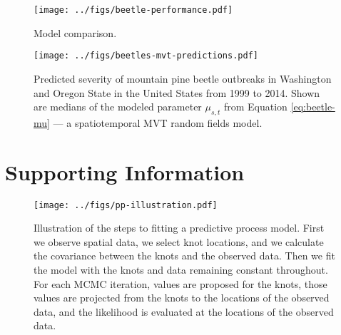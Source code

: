 \documentclass[12pt,english]{article}
\begin{document}
\begin{spacing}{1.3}
\begin{figure}[htb]
  \begin{center}
    \texttt{[image: ../figs/beetle-performance.pdf]}
    \caption{
      Model comparison.
    }
    \label{fig:map-etc}
  \end{center}
\end{figure}

\clearpage

\begin{figure}[htb]
  \begin{center}
    \texttt{[image: ../figs/beetles-mvt-predictions.pdf]}
    \caption{Predicted severity of mountain pine beetle outbreaks in Washington and
      Oregon State in the United States from 1999 to 2014.
      Shown are medians of the modeled parameter $\mu_{s,t}$ from Equation \ref{eq:beetle-mu}
      --- a spatiotemporal MVT random fields model.
    }
    \label{fig:beetle-pred}
  \end{center}
\end{figure}


\end{spacing}

\clearpage

\section{Supporting Information}

\renewcommand{\thefigure}{S\arabic{figure}}
\renewcommand{\thetable}{S\arabic{table}}
\setcounter{figure}{0}
\setcounter{table}{0}

\begin{figure}[htb]
  \begin{center}
    \texttt{[image: ../figs/pp-illustration.pdf]}
    \caption{
      Illustration of the steps to fitting a predictive process model.
      First we observe spatial data, we select knot locations,
      and we calculate the covariance between the knots and the observed data.
      Then we fit the model with the knots and data remaining constant throughout.
      For each MCMC iteration, values are proposed for the
      knots, those values are projected from the knots to the locations of the observed data,
      and the likelihood is evaluated at the locations of the observed data.}
    \label{fig:didactic}
  \end{center}
\end{figure}
\end{document}
